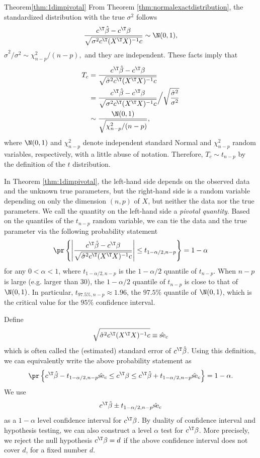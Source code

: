 \begin{myproof}{Theorem}{\ref{thm:1dimpivotal}}
From Theorem \ref{thm:normalexactdistribution}, the standardized
distribution with the true $\sigma^{2}$ follows
\[
\frac{c ^{\T}\hat{\beta}-c ^{\T}\beta}{\sqrt{\sigma^{2}c ^{\T}(X^{\T}X)^{-1}c }}\sim\N(0,1),
\]
 $\hat{\sigma}^{2}/\sigma^{2}\sim\chi_{n-p}^{2}/(n-p),$ and they
are independent. These facts imply that
\begin{align*}
T_c &= 
\frac{c ^{\T}\hat{\beta}-c ^{\T}\beta}{\sqrt{\hat{\sigma}^{2}c ^{\T}(X^{\T}X)^{-1}c }} \\
& =\frac{c ^{\T}\hat{\beta}-c ^{\T}\beta}{\sqrt{\sigma^{2}c ^{\T}(X^{\T}X)^{-1}c }}\Big/\sqrt{\frac{\hat{\sigma}^{2}}{\sigma^{2}}}\\
 & \sim \frac{\N(0,1)}{\sqrt{\chi_{n-p}^{2}/(n-p)}} ,
\end{align*}
where $\N(0,1)$ and $\chi_{n-p}^{2}$ denote independent standard Normal and $\chi_{n-p}^{2}$ random variables, respectively, with a little abuse of notation. Therefore, 
$T_c \sim t_{n-p}$ by the definition of the $t$ distribution. 
\end{myproof}



In Theorem \ref{thm:1dimpivotal}, the left-hand side
depends on the observed data and the unknown true parameters, but the
right-hand side is a random variable depending on only the dimension
$(n,p)$ of $X$, but neither the data nor the true parameters. We
call the quantity on the left-hand side a {\it pivotal quantity}. Based
on the quantiles of the $t_{n-p}$ random variable, we can tie the
data and the true parameter via the following probability statement
\[
\pr\left\{ \left|\frac{c ^{\T}\hat{\beta}-c ^{\T}\beta}{\sqrt{\hat{\sigma}^{2}c ^{\T}(X^{\T}X)^{-1}c }}\right|\leq  
t_{1-\alpha/2,n-p}
\right\} =1-\alpha
\]
 for any $0<\alpha<1$, where $t_{1-\alpha/2,n-p}  $ is the $1-\alpha/2$
quantile of $t_{n-p}$. 
When $n-p$ is large (e.g. larger than $30$), the $1-\alpha/2$ quantile of $t_{n-p}$ is close to that of $\N(0,1)$. 
In particular,  $t_{97.5\%,n-p}\approx 1.96$, the $97.5\%$ quantile of $\N(0,1)$, which is the critical value for the $95\%$ confidence interval. 


Define 
$$
\sqrt{\hat{\sigma}^{2}c ^{\T}(X^{\T}X)^{-1}c }\equiv \hat{\text{se}}_{c }
$$
which is often called the (estimated) standard error of $c ^{\T}\hat{\beta}$. Using this definition,
we can equivalently write the above probability statement as
\[
\pr\left\{ c ^{\T}\hat{\beta}- t_{1-\alpha/2,n-p} \hat{\text{se}}_{c }\leq c ^{\T}\beta\leq c ^{\T}\hat{\beta}+ t_{1-\alpha/2,n-p} \hat{\text{se}}_{c }\right\} =1-\alpha.
\]
We use 
\[
c ^{\T}\hat{\beta} \pm t_{1-\alpha/2,n-p} \hat{\text{se}}_{c } 
\]
as a $1-\alpha$ level confidence interval for $c ^{\T}\beta$. By duality of confidence
interval and hypothesis testing, we can also construct a level $\alpha$
test for $c ^{\T}\beta$. More precisely, we reject the null hypothesis $c ^{\T}\beta = d$ if the above confidence interval does not cover $d$, for a fixed number $d$. 


